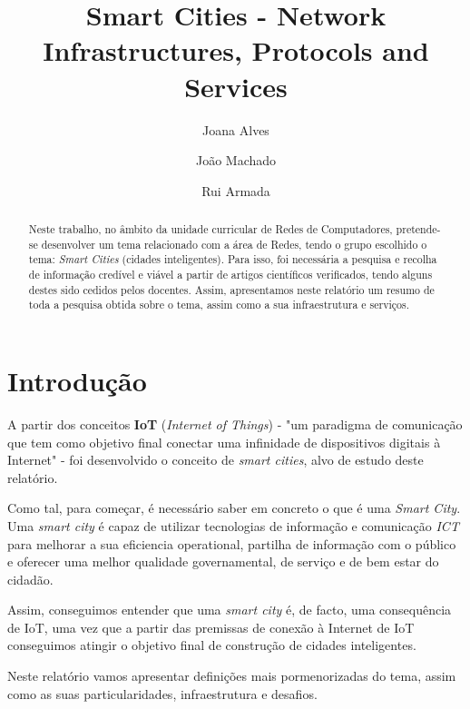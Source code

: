 \documentclass{llncs}
\begin{document}
%
\title{Smart Cities - Network Infrastructures, Protocols and Services}
%
%
\author{Joana Alves \and
João Machado  \and
Rui Armada}


\maketitle              %
%
\begin{abstract}
    \par Neste trabalho, no âmbito da unidade curricular de Redes de Computadores,
    pretende-se desenvolver um tema relacionado com a área de Redes, tendo o grupo escolhido 
    o tema: \textit{Smart Cities} (cidades inteligentes). Para isso, foi necessária a pesquisa
    e recolha de informação credível e viável a partir de artigos científicos verificados, tendo alguns destes sido cedidos pelos docentes.
    Assim, apresentamos neste relatório um resumo de toda a pesquisa obtida sobre o tema,
    assim como a sua infraestrutura e serviços.

\end{abstract}
%
%
%
\paragraph{}
\paragraph{}
\section{Introdução}
    \par A partir dos conceitos \textbf{IoT} (\textit{Internet of Things}) - "um paradigma de comunicação que tem como objetivo final conectar uma infinidade de dispositivos digitais à Internet" \cite{ref_article1} - foi desenvolvido o conceito de \textit{smart cities}, alvo de estudo deste relatório.
    \par Como tal, para começar, é necessário saber em concreto o que é uma \textit{Smart City}. Uma \textit{smart city} é capaz de utilizar tecnologias de informação e comunicação \textit{ICT} para melhorar a sua eficiencia operational, partilha de informação com o público e oferecer uma melhor qualidade governamental, de serviço e de bem estar do cidadão.
    \par Assim, conseguimos entender que uma \textit{smart city} é, de facto, uma consequência
    de IoT, uma vez que a partir das premissas de conexão à Internet de IoT conseguimos atingir o 
    objetivo final de construção de cidades inteligentes.
    \par Neste relatório vamos apresentar definições mais pormenorizadas do tema, assim
    como as suas particularidades, infraestrutura e desafios.
    
\end{document}
